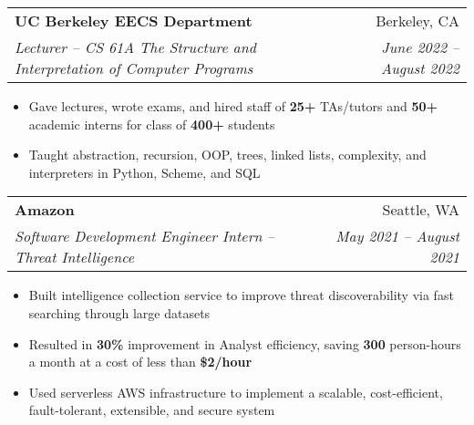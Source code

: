\documentclass[letterpaper,11pt]{article}
\makeatletter
\newcommand{\resumeItem}[1]{
  \item\small{
    {#1 \vspace{-4pt}}
  }
}
\newcommand{\resumeSubheading}[4]{
  \vspace{-2pt}\item
    \begin{tabular*}{0.97\textwidth}[t]{l@{\extracolsep{\fill}}r}
      \textbf{#1} & #2 \\
      \textit{\small#3} & \textit{\small #4} \\
    \end{tabular*}\vspace{-8pt}
}
\newcommand{\resumeItemListStart}{\begin{itemize}[leftmargin=0.2in]}
\newcommand{\resumeItemListEnd}{\end{itemize}\vspace{-5pt}}
\makeatother
\begin{document}
\resumeSubheading
    {UC Berkeley EECS Department}{Berkeley, CA}{Lecturer – CS 61A The Structure and Interpretation of Computer Programs}{June 2022 – August 2022}
    \resumeItemListStart
        \resumeItem{Gave lectures, wrote exams, and hired staff of \textbf{25+} TAs/tutors and \textbf{50+} academic interns for class of \textbf{400+} students}
        \resumeItem{Taught abstraction, recursion, OOP, trees, linked lists, complexity, and interpreters in Python, Scheme, and SQL}
    \resumeItemListEnd

\resumeSubheading
    {Amazon}{Seattle, WA}{Software Development Engineer Intern – Threat Intelligence}{May 2021 – August 2021}
    \resumeItemListStart
        \resumeItem{Built intelligence collection service to improve threat discoverability via fast searching through large datasets}
        \resumeItem{Resulted in \textbf{30\%} improvement in Analyst efficiency, saving \textbf{300} person-hours a month at a cost of less than \textbf{\$2/hour}}
        \resumeItem{Used serverless AWS infrastructure to implement a scalable, cost-efficient, fault-tolerant, extensible, and secure system}
    \resumeItemListEnd


\end{document}
